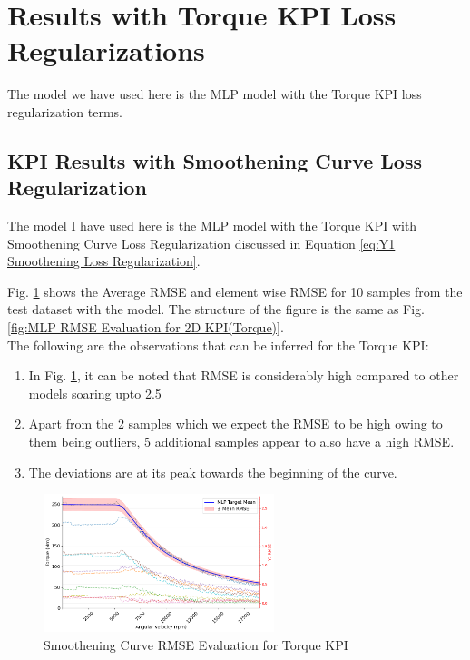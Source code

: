 \documentclass{report} %
\begin{document}
\section{Results with Torque KPI Loss Regularizations}\label{sec:Results with Torque KPI Loss Regularizations}

The model we have used here is the \ac{MLP} model with the Torque \ac{KPI} loss regularization terms.

\subsection{KPI Results with Smoothening Curve Loss Regularization}\label{subsec:KPI Results with Smoothening curve Loss Regularization}

The model I have used here is the \ac{MLP} model with the Torque \ac{KPI} with Smoothening Curve Loss Regularization discussed in 
Equation \ref{eq:Y1 Smoothening Loss Regularization}.

Fig. \ref{fig:Smoothening Torque RMSE Evaluation for 2D KPI(Torque)} shows the Average \ac{RMSE} and element wise \ac{RMSE} for 10 samples from the test dataset 
with the model. The structure of the figure is the same as Fig. \ref{fig:MLP RMSE Evaluation for 2D KPI(Torque)}.\\

The following are the observations that can be inferred for the Torque \ac{KPI}:
\begin{enumerate}[nosep]
    \item In Fig. \ref{fig:Smoothening Torque RMSE Evaluation for 2D KPI(Torque)}, it can be noted that \ac{RMSE} is considerably high compared to other models soaring upto 
    2.5
    \item Apart from the 2 samples which we expect the \ac{RMSE} to be high owing to them being outliers, 5 additional samples appear to also have a high \ac{RMSE}.
    \item The deviations are at its peak towards the beginning of the curve.
\end{enumerate}

\begin{figure}[H]
    \centering
    \includegraphics[width=0.6\textwidth]{./ReportImages/RMSE_MLP_Smoothening_y1.png} 
    \caption{Smoothening Curve \ac{RMSE} Evaluation for Torque \ac{KPI}} 
    \label{fig:Smoothening Torque RMSE Evaluation for 2D KPI(Torque)}
\end{figure}
\end{document}
